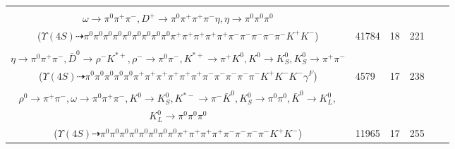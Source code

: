 \documentclass[landscape]{article}
\newcounter{rownumbers}
\newcommand\rn{\stepcounter{rownumbers}\arabic{rownumbers}}
\newcommand{\EOLP}{\\ \hline} %
\newcommand{\topoTags}[1]{#1} %
\begin{document}
\begin{longtable}{clcccc}
\rn & \makecell[l]{ $ 
\Upsilon(4S) \rightarrow B^{0} \bar{B}^{0} ,
B^{0} \rightarrow K^{-} K^{*+} ,
\bar{B}^{0} \rightarrow \pi^{0} \pi^{-} \eta \omega \omega D^{+} ,
K^{*+} \rightarrow \pi^{0} K^{+} ,
\eta \rightarrow \pi^{0} \pi^{+} \pi^{-} ,
\omega \rightarrow \pi^{0} \pi^{+} \pi^{-} ,
$ \\ $
\omega \rightarrow \pi^{0} \pi^{+} \pi^{-} ,
D^{+} \rightarrow \pi^{0} \pi^{+} \pi^{+} \pi^{-} \eta ,
\eta \rightarrow \pi^{0} \pi^{0} \pi^{0} 
$ \\ ($
\Upsilon(4S) \dashrightarrow \pi^{0} \pi^{0} \pi^{0} \pi^{0} \pi^{0} \pi^{0} \pi^{0} \pi^{0} \pi^{0} \pi^{+} \pi^{+} \pi^{+} \pi^{+} \pi^{+} \pi^{-} \pi^{-} \pi^{-} \pi^{-} \pi^{-} K^{+} K^{-} 
$) } & \topoTags{41784 & }18 & 221 \EOLP

\rn & \makecell[l]{ $ 
\Upsilon(4S) \rightarrow B^{0} \bar{B}^{0} ,
B^{0} \rightarrow K^{-} K_{0}^{*+} ,
\bar{B}^{0} \rightarrow \pi^{+} K^{-} D^{+} D^{*-} ,
K_{0}^{*+} \rightarrow \pi^{0} K^{+} ,
D^{+} \rightarrow \pi^{0} \pi^{0} \pi^{+} \pi^{+} \pi^{-} \eta \gamma^{F} ,
D^{*-} \rightarrow \pi^{-} \bar{D}^{0} ,
$ \\ $
\eta \rightarrow \pi^{0} \pi^{+} \pi^{-} ,
\bar{D}^{0} \rightarrow \rho^{-} K^{*+} ,
\rho^{-} \rightarrow \pi^{0} \pi^{-} ,
K^{*+} \rightarrow \pi^{+} K^{0} ,
K^{0} \rightarrow K_{S}^{0} ,
K_{S}^{0} \rightarrow \pi^{+} \pi^{-} 
$ \\ ($
\Upsilon(4S) \dashrightarrow \pi^{0} \pi^{0} \pi^{0} \pi^{0} \pi^{0} \pi^{+} \pi^{+} \pi^{+} \pi^{+} \pi^{+} \pi^{+} \pi^{-} \pi^{-} \pi^{-} \pi^{-} \pi^{-} K^{+} K^{-} K^{-} \gamma^{F} 
$) } & \topoTags{4579 & }17 & 238 \EOLP

\rn & \makecell[l]{ $ 
\Upsilon(4S) \rightarrow B^{0} \bar{B}^{0} ,
B^{0} \rightarrow \pi^{-} K_{0}^{*+} ,
\bar{B}^{0} \rightarrow \bar{K}^{*} \eta_{c}(2S) ,
K_{0}^{*+} \rightarrow \pi^{0} K^{+} ,
\bar{K}^{*} \rightarrow \pi^{+} K^{-} ,
\eta_{c}(2S) \rightarrow \pi^{0} \rho^{0} \pi^{+} \omega K^{0} K^{*-} ,
$ \\ $
\rho^{0} \rightarrow \pi^{+} \pi^{-} ,
\omega \rightarrow \pi^{0} \pi^{+} \pi^{-} ,
K^{0} \rightarrow K_{S}^{0} ,
K^{*-} \rightarrow \pi^{-} \bar{K}^{0} ,
K_{S}^{0} \rightarrow \pi^{0} \pi^{0} ,
\bar{K}^{0} \rightarrow K_{L}^{0} ,
$ \\ $
K_{L}^{0} \rightarrow \pi^{0} \pi^{0} \pi^{0} 
$ \\ ($
\Upsilon(4S) \dashrightarrow \pi^{0} \pi^{0} \pi^{0} \pi^{0} \pi^{0} \pi^{0} \pi^{0} \pi^{0} \pi^{+} \pi^{+} \pi^{+} \pi^{+} \pi^{-} \pi^{-} \pi^{-} \pi^{-} K^{+} K^{-} 
$) } & \topoTags{11965 & }17 & 255 \EOLP


\end{longtable}
\end{document}
